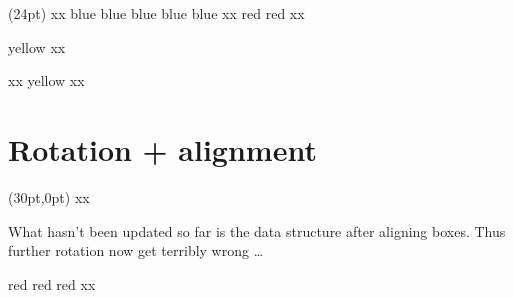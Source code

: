\documentclass{article}
\newcommand\cbox[2][.8]{{\setlength\fboxsep{0pt}\colorbox[gray]{#1}{#2}}}
\begin{document}
\adjustcoffinpole {}(24pt)
\displaycoffinpoles {}
x\cbox{\usebox \aaa }x
%
\rotatecoffin {}
\displaycoffinhandle {} {blue}
\displaycoffinhandle {} {blue}
\displaycoffinhandle {} {blue}
\displaycoffinhandle {} {blue}
\displaycoffinhandle {} {blue}
\quad
x\cbox{\usebox \aaa }x
\rotatecoffin {}
\displaycoffinhandle {} {red}
\displaycoffinhandle {} {red}
\quad
x\cbox{\usebox \aaa }x

\vspace{1cm}

\rotatecoffin {}
\displaycoffinhandle {} {yellow}
%
x\cbox{\usebox \aaa }x
%

\vspace{1cm}

x\cbox{\usebox \bbb }x
%
\rotatecoffin {}
\displaycoffinhandle {} {yellow}
\quad
x\cbox{\usebox \bbb }x


\section{Rotation + alignment}

\aligncoffins \aaa [b,l] \bbb[B,hc](30pt,0pt)
x\cbox{\usebox \aaa }x


What hasn't been updated so far is the data structure after aligning
boxes. Thus further rotation now get terribly wrong \ldots

\vspace{7cm}

\rotatecoffin {}
\displaycoffinhandle {} {red}
\displaycoffinhandle {} {red}
\displaycoffinhandle {} {red}
\quad
x\cbox{\usebox \aaa }x
\end{document}
